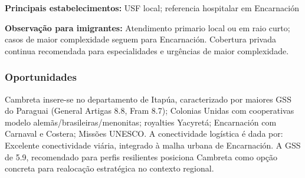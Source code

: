 \textbf{Principais estabelecimentos:} USF local; referencia hospitalar
em Encarnación

\textbf{Observação para imigrantes:} Atendimento primario local ou em
raio curto; casos de maior complexidade seguem para Encarnación.
Cobertura privada continua recomendada para especialidades e urgências
de maior complexidade.
\newpage

\subsubsection*{Oportunidades}\label{oport-cambreta-0703}
Cambreta insere-se no departamento de Itapúa, caracterizado por maiores GSS do Paraguai (General Artigas 8.8, Fram 8.7); Colonias Unidas com cooperativas modelo alemãs/brasileiras/menonitas; royalties Yacyretá; Encarnación com Carnaval e Costera; Missões UNESCO. A conectividade logística é dada por: Excelente conectividade viária, integrado à malha urbana de Encarnación. A GSS de 5.9, recomendado para perfis resilientes posiciona Cambreta como opção concreta para realocação estratégica no contexto regional.

